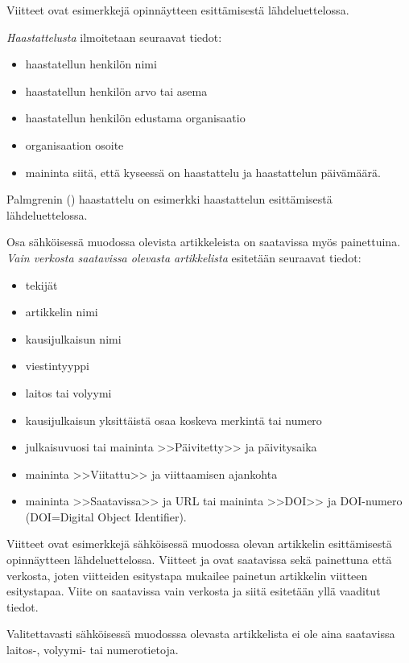 Viitteet \citep{Miinusmaa,Lonnqvist} ovat esimerkkejä
opinnäytteen esittämisestä lähdeluettelossa. 


\textit{Haastattelusta} ilmoitetaan seuraavat tiedot:

\begin{itemize}
\item[--]haastatellun henkilön nimi
\item[--]haastatellun henkilön arvo tai asema
\item[--]haastatellun henkilön edustama organisaatio
\item[--]organisaation osoite
\item[--]maininta siitä, että kyseessä on haastattelu ja haastattelun
päivämäärä. 
\end{itemize}

Palmgrenin (\citeyear{haastattelu}) haastattelu on esimerkki
haastattelun esittämisestä lähdeluettelossa.

Osa sähköisessä muodossa olevista artikkeleista on saatavissa myös
painettuina. \textit{Vain verkosta saatavissa olevasta artikkelista} esitetään
seuraavat tiedot:

\begin{itemize}
\item[--]tekijät
\item[--]artikkelin nimi
\item[--]kausijulkaisun nimi
\item[--]viestintyyppi
\item[--]laitos tai volyymi
\item[--]kausijulkaisun yksittäistä osaa koskeva merkintä tai numero
\item[--]julkaisuvuosi tai maininta >>Päivitetty>> ja päivitysaika
\item[--]maininta >>Viitattu>> ja viittaamisen ajankohta 
\item[--]maininta >>Saatavissa>> ja URL tai 
        maininta >>DOI>> ja DOI-numero (DOI=Digital Object Identifier).
\end{itemize}

Viitteet \citep{Ribeiro,Stieber,kone} ovat esimerkkejä sähköisessä
muodossa olevan artikkelin esittämisestä opinnäytteen
lähdeluettelossa.  Viitteet \citep{Ribeiro} ja \citep{Stieber} ovat
saatavissa sekä painettuna että verkosta, joten viitteiden esitystapa
mukailee painetun artikkelin viitteen esitystapaa. Viite \citep{kone} on
saatavissa vain verkosta ja siitä esitetään yllä vaaditut tiedot.

Valitettavasti sähköisessä muodosssa olevasta artikkelista ei ole aina 
saatavissa lai\-tos-, volyymi- tai numerotietoja.

